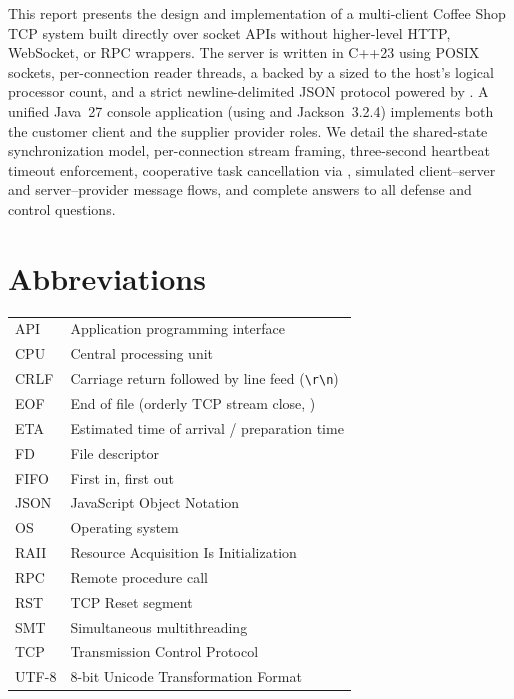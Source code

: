 \documentclass{../latex/utmreport}
\begin{document}
\makeutmreporttitlepage
\tableofcontents
\clearpage

\begin{utmabstract}[Abstract]
This report presents the design and implementation of a multi-client Coffee Shop TCP system built directly over socket APIs without higher-level HTTP, WebSocket, or RPC wrappers. The server is written in C++23 using POSIX sockets, per-connection reader threads, a  backed by a  sized to the host's logical processor count, and a strict newline-delimited JSON protocol powered by . A unified Java~27 console application (using  and Jackson~3.2.4) implements both the customer client and the supplier provider roles. We detail the shared-state synchronization model, per-connection stream framing, three-second heartbeat timeout enforcement, cooperative task cancellation via , simulated client--server and server--provider message flows, and complete answers to all defense and control questions.
\end{utmabstract}

\chapter*{Abbreviations}
\noindent\begin{tabularx}{\textwidth}{lY}
API & Application programming interface \\
CPU & Central processing unit \\
CRLF & Carriage return followed by line feed (\texttt{\textbackslash r\textbackslash n}) \\
EOF & End of file (orderly TCP stream close, ) \\
ETA & Estimated time of arrival / preparation time \\
FD & File descriptor \\
FIFO & First in, first out \\
JSON & JavaScript Object Notation \\
OS & Operating system \\
RAII & Resource Acquisition Is Initialization \\
RPC & Remote procedure call \\
RST & TCP Reset segment \\
SMT & Simultaneous multithreading \\
TCP & Transmission Control Protocol \\
UTF-8 & 8-bit Unicode Transformation Format \\
\end{tabularx}
\end{document}
